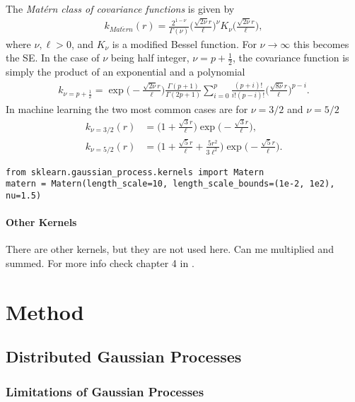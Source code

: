 \documentclass[twoside,english]{uiofysmaster}
\begin{document}
The \textit{Mat\'{e}rn class of covariance functions} is given by
\begin{align}
k_{Mat\acute{e}rn} (r) = \frac{2^{1- \nu}}{\Gamma (\nu)} \Big( \frac{\sqrt{2 \nu} r	}{\ell} \Big)^{\nu} K_{\nu} \Big( \frac{\sqrt{2 \nu}r}{\ell} \Big),
\end{align}
where $\nu, \ell > 0$, and $K_{\nu}$ is a modified Bessel function. For $\nu \rightarrow \infty$ this becomes the SE. In the case of $\nu$ being half integer, $\nu = p + \frac{1}{2}$, the covariance function is simply the product of an exponential and a polynomial
\begin{align}
k_{\nu=p+\frac{1}{2}} = \exp \Big(- \frac{\sqrt{2 \nu} r	}{\ell} \Big) \frac{\Gamma(p+1)}{\Gamma(2p + 1)} \sum^p_{i=0} \frac{(p+i)!}{i!(p-i)!} \Big( \frac{\sqrt{8 \nu} r	}{\ell} \Big)^{p-i}.
\end{align}
In machine learning the two most common cases are for $\nu = 3/2$ and $\nu = 5/2$
\begin{align}
k_{\nu = 3/2}(r) &=  \Big(1 + \frac{\sqrt{3}r}{\ell} \Big) \exp \Big( -\frac{\sqrt{3}r}{\ell} \Big),\\
k_{\nu = 5/2}(r) &=  \Big(1 + \frac{\sqrt{5}r}{\ell}  + \frac{5r^2}{3 \ell^2}\Big) \exp \Big( -\frac{\sqrt{5}r}{\ell} \Big).
\end{align}

\begin{lstlisting}
from sklearn.gaussian_process.kernels import Matern
matern = Matern(length_scale=10, length_scale_bounds=(1e-2, 1e2), nu=1.5)
\end{lstlisting}

\subsubsection{Other Kernels}

There are other kernels, but they are not used here. Can me multiplied and summed. For more info check chapter 4 in \cite{rasmussen2006gaussian}.




\chapter{Method}

\section{Distributed Gaussian Processes}

\subsection{Limitations of Gaussian Processes}
\end{document}
